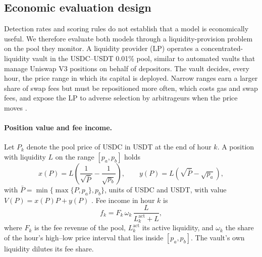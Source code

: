 \subsection{Economic evaluation design}\label{sec:econ_design}

Detection rates and scoring rules do not establish that a model is economically useful. We
therefore evaluate both models through a liquidity-provision problem on the pool they monitor.
A liquidity provider (LP) operates a concentrated-liquidity vault in the USDC--USDT 0.01\% pool,
similar to automated vaults that manage Uniswap V3 positions on behalf of depositors. The
vault decides, every hour, the price range in which its capital is deployed. Narrow ranges earn
a larger share of swap fees but must be repositioned more often, which costs gas and swap fees,
and expose the LP to adverse selection by arbitrageurs when the price moves
\citep{Milionis2022}.

\paragraph{Position value and fee income.} Let $P_k$ denote the pool price of USDC in USDT at
the end of hour $k$. A position with liquidity $L$ on the range $[p_a,p_b]$ holds
\begin{equation}
x(P)=L\left(\frac{1}{\sqrt{\bar P}}-\frac{1}{\sqrt{p_b}}\right),\qquad
y(P)=L\left(\sqrt{\bar P}-\sqrt{p_a}\right),
\end{equation}
with $\bar P=\min\{\max\{P,p_a\},p_b\}$,
units of USDC and USDT, with value $V(P)=x(P)P+y(P)$ \citep{uniswap_whitepaper}. Fee income in
hour $k$ is
\begin{equation}
f_k=F_k\,\omega_k\,\frac{L}{L^{\mathrm{act}}_k+L},
\end{equation}
where $F_k$ is the fee revenue of the pool, $L^{\mathrm{act}}_k$ its active liquidity, and
$\omega_k$ the share of the hour's high--low price interval that lies inside $[p_a,p_b]$. The
vault's own liquidity dilutes its fee share.

